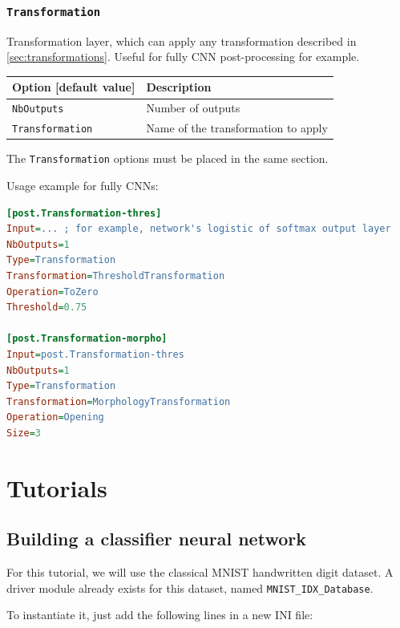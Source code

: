 \documentclass[a4paper,11pt,oneside]{article}
\begin{document}
\subsubsection{\texorpdfstring{%
\lstinline[basicstyle=\ttfamily\bfseries]!Transformation!}{Transformation}}
Transformation layer, which can apply any transformation described in \ref{sec:transformations}. Useful for fully CNN post-processing for example.

\begin{center}
 \begin{longtable}{| p{5cm} | p{10cm} | }
 \hline
 Option [default value] & Description\\
 \hline\hline
  \cellcolor{requiredcolor}\lstinline!NbOutputs! & Number of outputs \\
  \cellcolor{requiredcolor}\lstinline!Transformation! & Name of the
  transformation to apply \\
 \hline
\end{longtable}
\end{center}

The \lstinline!Transformation! options must be placed in the same section.


Usage example for fully CNNs:
\begin{lstlisting}[language=ini]
[post.Transformation-thres]
Input=... ; for example, network's logistic of softmax output layer
NbOutputs=1
Type=Transformation
Transformation=ThresholdTransformation
Operation=ToZero
Threshold=0.75

[post.Transformation-morpho]
Input=post.Transformation-thres
NbOutputs=1
Type=Transformation
Transformation=MorphologyTransformation
Operation=Opening
Size=3
\end{lstlisting}

\clearpage

\section{Tutorials}

\subsection{\label{sec:BuildingClassifierNN}Building a classifier neural
network}

For this tutorial, we will use the classical MNIST handwritten digit dataset.
A driver module already exists for this dataset, named
\lstinline!MNIST_IDX_Database!.

To instantiate it, just add the following lines in a new INI file:
\end{document}
